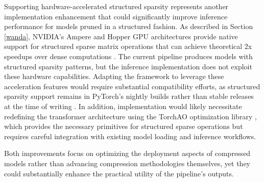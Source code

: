 Supporting hardware-accelerated structured sparsity represents another implementation enhancement that could significantly improve inference performance for models pruned in a structured fashion. As described in Section \ref{wanda}, NVIDIA's Ampere and Hopper GPU architectures provide native support for structured sparse matrix operations that can achieve theoretical 2x speedups over dense computations \cite{nvidia-width}. The current pipeline produces models with structured sparsity patterns, but the inference implementation does not exploit these hardware capabilities. Adapting the framework to leverage these acceleration features would require substantial compatibility efforts, as structured sparsity support remains in PyTorch's nightly builds rather than stable releases at the time of writing \cite{pytorch_sparsity}. In addition, implementation would likely necessitate redefining the transformer architecture using the TorchAO optimization library \cite{torchao}, which provides the necessary primitives for structured sparse operations but requires careful integration with existing model loading and inference workflows.

Both improvements focus on optimizing the deployment aspects of compressed models rather than advancing compression methodologies themselves, yet they could substantially enhance the practical utility of the pipeline's outputs.